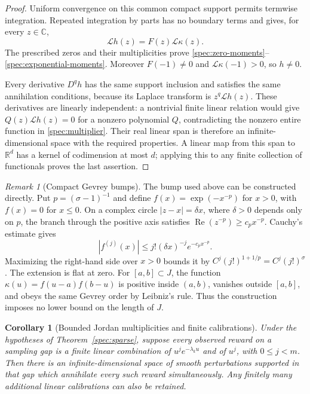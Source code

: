 \documentclass[11pt]{article}
\newtheorem{corollary}[theorem]{Corollary}
\theoremstyle{definition}
\theoremstyle{remark}
\newtheorem{remark}[theorem]{Remark}
\numberwithin{equation}{section}
\begin{document}
\begin{proof}
Uniform convergence on this common compact support permits
termwise integration. Repeated integration by parts has no boundary
terms and gives, for every $z\in\mathbb C$,
\begin{equation}\label{spec:multiplier}
                         \mathcal Lh(z)=F(z)\mathcal L\kappa(z).
\end{equation}
The prescribed zeros and their multiplicities prove
\eqref{spec:zero-moments}--\eqref{spec:exponential-moments}.
Moreover $F(-1)\ne0$ and $\mathcal L\kappa(-1)>0$, so $h\ne0$.

Every derivative $D^qh$ has the same support inclusion and satisfies
the same annihilation conditions, because its Laplace transform is
$z^q\mathcal Lh(z)$. These derivatives are linearly independent:
a nontrivial finite linear relation would give
$Q(z)\mathcal Lh(z)=0$ for a nonzero polynomial $Q$, contradicting
the nonzero entire function in \eqref{spec:multiplier}.
Their real linear span is therefore an infinite-dimensional space
with the required properties. A linear map from this span to
$\mathbb R^d$ has a kernel of codimension at most $d$; applying this
to any finite collection of functionals proves the last assertion.
\end{proof}

\begin{remark}[Compact Gevrey bumps]
\label{spec:bump}
The bump used above can be constructed directly. Put
$p=(\sigma-1)^{-1}$ and define $f(x)=\exp(-x^{-p})$ for $x>0$,
with $f(x)=0$ for $x\le0$. On a complex circle
$|z-x|=\delta x$, where $\delta>0$ depends only on $p$, the branch
through the positive axis satisfies
$\operatorname{Re}(z^{-p})\ge c_p x^{-p}$. Cauchy's estimate gives
\[
 |f^{(j)}(x)|\le j!(\delta x)^{-j}e^{-c_p x^{-p}}.
\]
Maximizing the right-hand side over $x>0$ bounds it by
$C^j(j!)^{1+1/p}=C^j(j!)^\sigma$. The extension is flat at zero.
For $[a,b]\subset J$, the function
$\kappa(u)=f(u-a)f(b-u)$ is positive inside $(a,b)$, vanishes
outside $[a,b]$, and obeys the same Gevrey order by Leibniz's rule.
Thus the construction imposes no lower bound on the length of $J$.
\end{remark}

\begin{corollary}[Bounded Jordan multiplicities and finite calibrations]
\label{spec:jordan}
Under the hypotheses of Theorem~\ref{spec:sparse}, suppose every
observed reward on a sampling gap is a finite linear combination of
$u^je^{-\lambda_k u}$ and of $u^j$, with $0\le j<m$. Then there is
an infinite-dimensional space of smooth perturbations supported in
that gap which annihilate every such reward simultaneously. Any
finitely many additional linear calibrations can also be retained.
\end{corollary}
\end{document}
